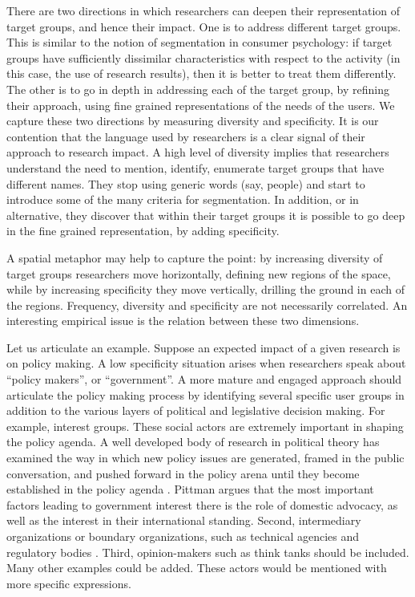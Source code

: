 \documentclass[]{book}
\theoremstyle{definition}
\theoremstyle{definition}
\theoremstyle{definition}
\theoremstyle{remark}
\begin{document}
There are two directions in which researchers can deepen their
representation of target groups, and hence their impact. One is to
address different target groups. This is similar to the notion of
segmentation in consumer psychology: if target groups have sufficiently
dissimilar characteristics with respect to the activity (in this case,
the use of research results), then it is better to treat them
differently. The other is to go in depth in addressing each of the
target group, by refining their approach, using fine grained
representations of the needs of the users. We capture these two
directions by measuring diversity and specificity. It is our contention
that the language used by researchers is a clear signal of their
approach to research impact. A high level of diversity implies that
researchers understand the need to mention, identify, enumerate target
groups that have different names. They stop using generic words (say,
people) and start to introduce some of the many criteria for
segmentation. In addition, or in alternative, they discover that within
their target groups it is possible to go deep in the fine grained
representation, by adding specificity.

A spatial metaphor may help to capture the point: by increasing
diversity of target groups researchers move horizontally, defining new
regions of the space, while by increasing specificity they move
vertically, drilling the ground in each of the regions. Frequency,
diversity and specificity are not necessarily correlated. An interesting
empirical issue is the relation between these two dimensions.

Let us articulate an example. Suppose an expected impact of a given
research is on policy making. A low specificity situation arises when
researchers speak about ``policy makers'', or ``government''. A more
mature and engaged approach should articulate the policy making process
by identifying several specific user groups in addition to the various
layers of political and legislative decision making. For example,
interest groups. These social actors are extremely important in shaping
the policy agenda. A well developed body of research in political theory
has examined the way in which new policy issues are generated, framed in
the public conversation, and pushed forward in the policy arena until
they become established in the policy agenda
\citep{sabatier1987knowledge}. Pittman \citep{pittman2006beyond} argues
that the most important factors leading to government interest there is
the role of domestic advocacy, as well as the interest in their
international standing. Second, intermediary organizations or boundary
organizations, such as technical agencies and regulatory bodies
\citep{agrawala2001integrating}. Third, opinion-makers such as think
tanks should be included. Many other examples could be added. These
actors would be mentioned with more specific expressions.
\end{document}

